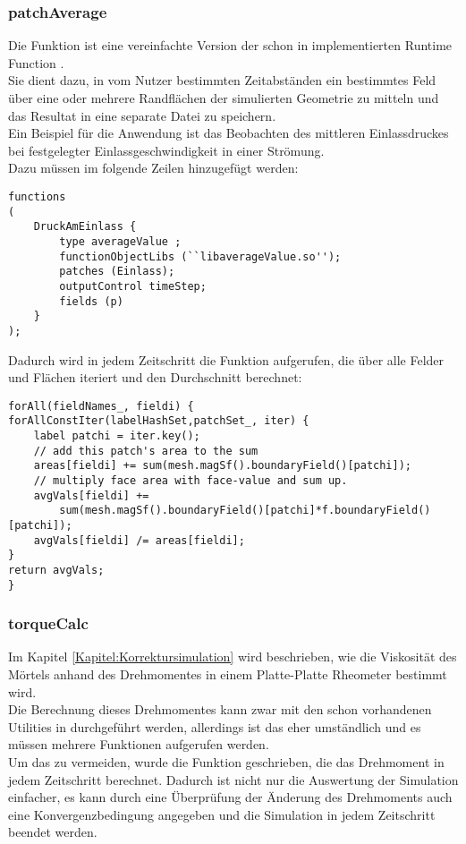 \subsubsection{patchAverage}
Die Funktion  ist eine vereinfachte Version der schon in \openfoam{} implementierten Runtime Function .\\
Sie dient dazu, in vom Nutzer bestimmten Zeitabständen ein bestimmtes Feld über eine oder mehrere Randflächen der simulierten Geometrie zu mitteln und das Resultat in eine separate Datei zu speichern.\\
Ein Beispiel für die Anwendung ist das Beobachten des mittleren Einlassdruckes bei festgelegter Einlassgeschwindigkeit in einer Strömung.\\
Dazu müssen im  folgende Zeilen hinzugefügt werden:
%
\begin{lstlisting}
functions
(
    DruckAmEinlass {
        type averageValue ;
        functionObjectLibs (``libaverageValue.so'');
        patches (Einlass);
        outputControl timeStep;
        fields (p)
    }
);
\end{lstlisting}
%
Dadurch wird in jedem Zeitschritt die Funktion  aufgerufen, die über alle Felder und Flächen iteriert und den Durchschnitt berechnet:
%
\begin{lstlisting}
forAll(fieldNames_, fieldi) {    
forAllConstIter(labelHashSet,patchSet_, iter) {
    label patchi = iter.key();
    // add this patch's area to the sum
    areas[fieldi] += sum(mesh.magSf().boundaryField()[patchi]);
    // multiply face area with face-value and sum up.
    avgVals[fieldi] +=
        sum(mesh.magSf().boundaryField()[patchi]*f.boundaryField()[patchi]);
    avgVals[fieldi] /= areas[fieldi];
}
return avgVals;
}
\end{lstlisting}
%
\subsubsection{torqueCalc}
Im Kapitel \ref{Kapitel:Korrektursimulation} wird beschrieben, wie die Viskosität des Mörtels anhand des Drehmomentes in einem Platte-Platte Rheometer bestimmt wird.\\
Die Berechnung dieses Drehmomentes kann zwar mit den schon vorhandenen Utilities in \openfoam{} durchgeführt werden, allerdings ist das eher umständlich und es müssen mehrere Funktionen aufgerufen werden.\\
Um das zu vermeiden, wurde die Funktion  geschrieben, die das Drehmoment in jedem Zeitschritt berechnet.
Dadurch ist nicht nur die Auswertung der Simulation einfacher, es kann durch eine Überprüfung der Änderung des Drehmoments auch eine Konvergenzbedingung angegeben und die Simulation in jedem Zeitschritt beendet werden.

